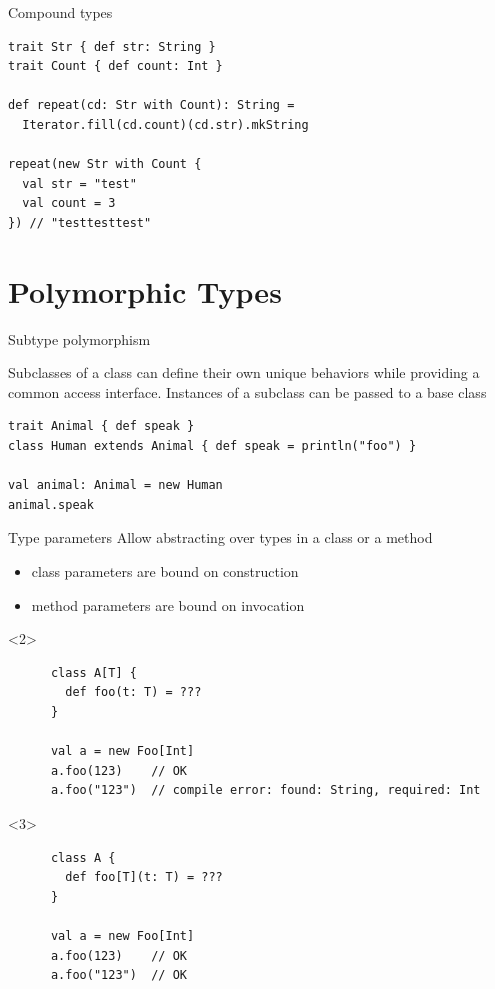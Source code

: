 \documentclass[aspectratio=169]{beamer}
\begin{document}
\begin{frame}[fragile]{Compound types}
\begin{verbatim}
trait Str { def str: String }
trait Count { def count: Int }

def repeat(cd: Str with Count): String =
  Iterator.fill(cd.count)(cd.str).mkString

repeat(new Str with Count {
  val str = "test"
  val count = 3
}) // "testtesttest"
\end{verbatim}
\end{frame}

\section{Polymorphic Types}

\begin{frame}[fragile]{Subtype polymorphism}
  \vspace{-2em}
\begin{block}{}
  Subclasses of a class can define their own unique behaviors while providing a common access
  interface. Instances of a subclass can be passed to a base class
\end{block}
\begin{verbatim}
trait Animal { def speak }
class Human extends Animal { def speak = println("foo") }

val animal: Animal = new Human
animal.speak
\end{verbatim}
\end{frame}

\begin{frame}[fragile]{Type parameters}
  Allow abstracting over types in a class or a method
  \begin{itemize}
    \item class parameters are bound on \alert{construction}
    \item method parameters are bound on \alert{invocation} 
  \end{itemize}
  \vspace{1em}
  \pause
  \begin{onlyenv}<2>
    \begin{verbatim}
      class A[T] {
        def foo(t: T) = ???
      }

      val a = new Foo[Int]
      a.foo(123)    // OK
      a.foo("123")  // compile error: found: String, required: Int
    \end{verbatim}
  \end{onlyenv}
  \begin{onlyenv}<3>
    \begin{verbatim}
      class A {
        def foo[T](t: T) = ???
      }

      val a = new Foo[Int]
      a.foo(123)    // OK
      a.foo("123")  // OK
    \end{verbatim}
  \end{onlyenv}
\end{frame}
\end{document}
